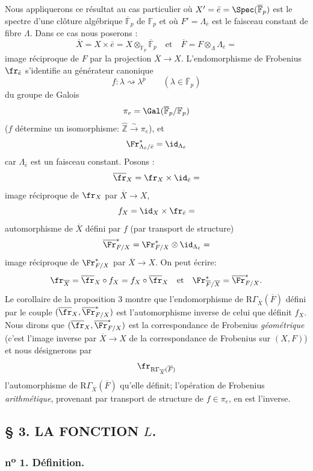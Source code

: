Nous appliquerons ce résultat au cas particulier où $X'=\bar e=\Spec(\overline{\mathbb{F}}_p)$ est le spectre d'une clôture algébrique $\overline{\mathbb{F}}_p$ de $\mathbb{F}_p$ et où $F'=\Lambda_{\bar e}$ est le faisceau constant de fibre $\Lambda$. Dans ce cas nous poserons :
\[
\overline X=X\times\bar e=X\otimes_{\mathbb{F}_p}\overline{\mathbb{F}}_p\quad\text{et}\quad
\overline F=F\otimes_\Lambda\Lambda_{\bar e}=
\]
image réciproque de $F$ par la projection $\overline X\to X$. L'endomorphisme de Frobenius $\fr_{\bar e}$ s'identifie au générateur canonique
\[
f:\lambda\rightsquigarrow\lambda^p\qquad(\lambda\in\overline{\mathbb{F}}_p)
\]
du groupe de Galois
\[
\pi_e=\Gal(\overline{\mathbb{F}}_p/\mathbb{F}_p)
\]
($f$ détermine un isomorphisme: $\widehat{\mathbb{Z}}\xrightarrow{\sim}\pi_e$), et
\[
\Fr^*_{\Lambda_{\bar e}/\bar e}=\id_{\Lambda_{\bar e}}
\]
car $\Lambda_{\bar e}$ est un faisceau constant. Posons :
\[
\overline{\fr}_X=\fr_X\times\id_{\bar e}=
\]
image réciproque de $\fr_X$ par $\overline X\to X$,
\[
f_X=\id_X\times\fr_{\bar e}=
\]
automorphisme de $\overline X$ défini par $f$ (par transport de structure)
\[
\overline{\Fr}^*_{F/X}=\Fr^*_{F/X}\otimes\id_{\Lambda_{\bar e}}=
\]
image réciproque de $\Fr^*_{F/X}$ par $\overline X\to X$. On peut écrire:
\[
\fr_{\overline X}=\overline{\fr}_X\circ f_X=f_X\circ\overline{\fr}_X\quad\text{et}\quad
\Fr^*_{\overline F/\overline X}=\overline{\Fr}^*_{F/X}.
\]
Le corollaire de la proposition 3 montre que l'endomorphisme de $\mathrm{R}\Gamma_{\overline X}(\overline F)$ défini par le couple $(\overline{\fr}_X,\overline{\Fr}^*_{F/X})$ est l'automorphisme inverse de celui que définit $f_X$. Nous dirons que $(\overline{\fr}_X,\overline{\Fr}^*_{F/X})$ est la correspondance de Frobenius \emph{géométrique} (c'est l'image inverse par $\overline X\to X$ de la correspondance de Frobenius sur $(X,F)$) et nous désignerons par
\[
\fr_{\mathrm{R}\Gamma_{\overline X}(\overline F)}
\]
l'automorphisme de $\mathrm{R}\Gamma_{\overline X}(\overline F)$ qu'elle définit; l'opération de Frobenius \emph{arithmétique}, provenant par transport de structure de $f\in\pi_e$, en est l'inverse.

\subsection*{§ 3. LA FONCTION $L$.}

\subsubsection*{n\textsuperscript{o} 1. Définition.}

